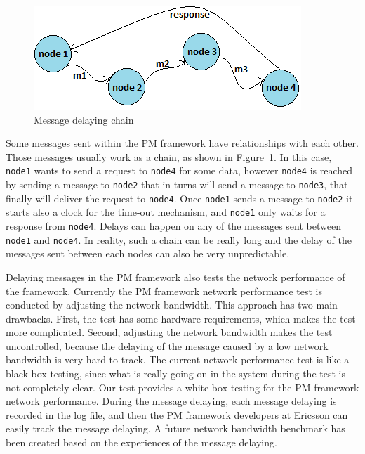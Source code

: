 \begin{figure}[hh!]
\centering
\includegraphics[width=.7\columnwidth]{figure/chaningMSG.png}
\caption{Message delaying chain \label{chaning}}
\end{figure}

Some messages sent within the PM framework have relationships with each other. Those messages usually work as a chain, as shown in Figure~\ref{chaning}. In this case, \texttt{node1} wants to send a request to \texttt{node4} for some data, however \texttt{node4} is reached by sending a message to \texttt{node2} that in turns will send a message to \texttt{node3}, that finally will deliver the request to  \texttt{node4}. 
Once \texttt{node1} sends a message to \texttt{node2} it starts also a clock for the time-out mechanism, and 
\texttt{node1} only waits for a response from \texttt{node4}. Delays can happen on any of the messages sent between \texttt{node1} and \texttt{node4}. In reality, such a chain can be really long and the delay of the messages sent between each nodes can also be very unpredictable.

Delaying messages in the PM framework also tests the network performance of the framework. %
Currently the PM framework network performance test is conducted by adjusting the network bandwidth. This approach has two main drawbacks. First, the test has some hardware requirements, which makes the test more complicated. Second, adjusting the network bandwidth makes the test uncontrolled, because the delaying of the message caused by a low network bandwidth is very hard to track. The current network performance test is like a black-box testing, since what is really going on in the system during the test is not completely clear. Our test provides a white box testing for the PM framework network performance. During the message delaying, each message delaying is recorded in the log file, and then the PM framework developers at Ericsson can easily track the message delaying. A future network bandwidth benchmark has been created based on the experiences of the message delaying.



